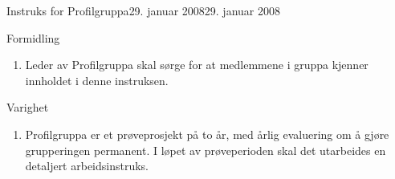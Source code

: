 \documentclass[../fsbok.tex]{subfiles}
\begin{document}
\begin{instruks}{Instruks for Profilgruppa}{29. januar 2008}{29. januar 2008}
    \begin{instruksledd}{Formidling}
        \begin{enumerate}
            \item Leder av Profilgruppa skal sørge for at medlemmene i gruppa kjenner innholdet i denne instruksen.
        \end{enumerate}
    \end{instruksledd}

    \begin{instruksledd}{Varighet}
        \begin{enumerate}
            \item Profilgruppa er et prøveprosjekt på to år, med årlig evaluering om å gjøre grupperingen permanent. I løpet av
prøveperioden skal det utarbeides en detaljert arbeidsinstruks.
        \end{enumerate}
    \end{instruksledd}
    
\end{instruks}
\end{document}
